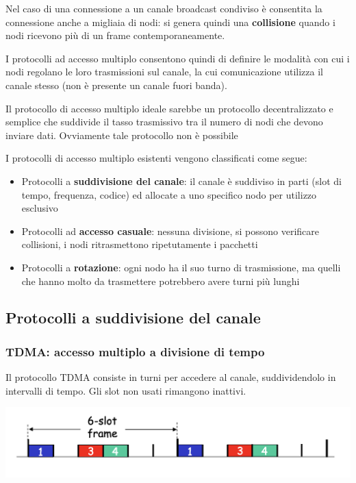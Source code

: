 \documentclass{report}
\begin{document}
Nel caso di una connessione a un canale broadcast condiviso è consentita
la connessione anche a migliaia di nodi: si genera quindi una
\textbf{collisione} quando i nodi ricevono più di un frame
contemporaneamente.

I protocolli ad accesso multiplo consentono quindi di definire le
modalità con cui i nodi regolano le loro trasmissioni sul canale, la cui
comunicazione utilizza il canale stesso (non è presente un canale fuori
banda).

Il protocollo di accesso multiplo ideale sarebbe un protocollo
decentralizzato e semplice che suddivide il tasso trasmissivo tra il
numero di nodi che devono inviare dati. Ovviamente tale protocollo non è
possibile

I protocolli di accesso multiplo esistenti vengono classificati come
segue:

\begin{itemize}
\item
  Protocolli a \textbf{suddivisione del canale}: il canale è suddiviso
  in parti (slot di tempo, frequenza, codice) ed allocate a uno
  specifico nodo per utilizzo esclusivo
\item
  Protocolli ad \textbf{accesso casuale}: nessuna divisione, si possono
  verificare collisioni, i nodi ritrasmettono ripetutamente i pacchetti
\item
  Protocolli a \textbf{rotazione}: ogni nodo ha il suo turno di
  trasmissione, ma quelli che hanno molto da trasmettere potrebbero
  avere turni più lunghi
\end{itemize}

\hypertarget{header-n57}{%
\subsection{Protocolli a suddivisione del canale}\label{header-n57}}

\hypertarget{header-n58}{%
\subsubsection{TDMA: accesso multiplo a divisione di
tempo}\label{header-n58}}

Il protocollo TDMA consiste in turni per accedere al canale,
suddividendolo in intervalli di tempo. Gli slot non usati rimangono
inattivi.

\begin{center}
		\includegraphics[width=0.7\linewidth]{tdma}
	\end{center}
\end{document}
